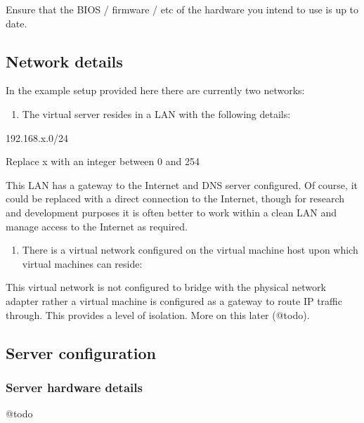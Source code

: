 \documentclass[
	11pt, %
	fleqn, %
	a4paper, %
]{LegrandOrangeBook}
\providecommand{\tightlist}{%
  \setlength{\itemsep}{0pt}\setlength{\parskip}{0pt}}
\begin{document}
Ensure that the BIOS / firmware / etc of the hardware you intend to use
is up to date.

\hypertarget{network-details}{%
\subsection{Network details}\label{network-details}}

In the example setup provided here there are currently two networks:

\begin{enumerate}
\def\labelenumi{\arabic{enumi}.}
\tightlist
\item
  The virtual server resides in a LAN with the following details:
\end{enumerate}

192.168.x.0/24

Replace x with an integer between 0 and 254

This LAN has a gateway to the Internet and DNS server configured. Of
course, it could be replaced with a direct connection to the Internet,
though for research and development purposes it is often better to work
within a clean LAN and manage access to the Internet as required.

\begin{enumerate}
\def\labelenumi{\arabic{enumi}.}
\setcounter{enumi}{1}
\tightlist
\item
  There is a virtual network configured on the virtual machine host upon
  which virtual machines can reside:
\end{enumerate}

This virtual network is not configured to bridge with the physical
network adapter rather a virtual machine is configured as a gateway to
route IP traffic through. This provides a level of isolation. More on
this later (@todo).

\hypertarget{server-configuration}{%
\subsection{Server configuration}\label{server-configuration}}

\hypertarget{server-hardware-details}{%
\subsubsection{Server hardware details}\label{server-hardware-details}}

@todo
\end{document}

